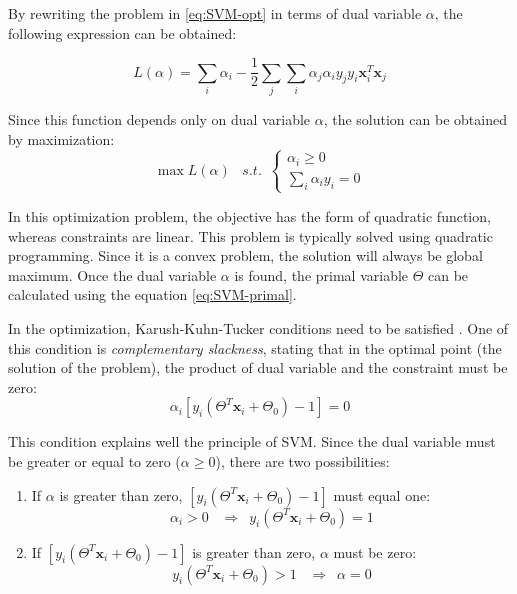 By rewriting the problem in \ref{eq:SVM-opt} in terms of dual variable $\alpha$, the following expression can be obtained:

\begin{equation} 
L(\alpha) = \sum_i \alpha_i - \frac{1}{2} \sum_j \sum_i \alpha_j \alpha_i y_j y_i \mathbf{x}_i^T \mathbf{x}_j
\end{equation}

Since this function depends only on dual variable $\alpha$, the solution can be obtained by maximization:
\begin{equation} 
\max L(\alpha) \,\,\,\,\, s.t. \,\,\, \left\{\begin{array}{lr} \alpha_i \geq 0 \\
\sum_{i} \alpha_i y_i = 0  \end{array}\right.
\end{equation}

In this optimization problem, the objective has the form of quadratic function, whereas constraints are linear. This problem is typically solved using quadratic programming. Since it is a convex problem, the solution will always be global maximum. Once the dual variable $\alpha$ is found, the primal variable $\Theta$ can be calculated using the equation \ref{eq:SVM-primal}.

In the optimization, Karush-Kuhn-Tucker conditions need to be satisfied \citep{Boyd2004}. One of this condition is \emph{complementary slackness}, stating that in the optimal point (the solution of the problem), the product of dual variable and the constraint must be zero:
\begin{equation} 
\alpha_i \left[ y_i \left( \Theta^T\mathbf{x}_i + \Theta_0  \right) -1 \right] = 0
\end{equation}

This condition explains well the principle of SVM. Since the dual variable must be greater or equal to zero ($\alpha \geq 0$), there are two possibilities:
\begin{enumerate}
\item
If $\alpha$ is greater than zero, $\left[ y_i \left( \Theta^T\mathbf{x}_i + \Theta_0  \right) -1 \right]$ must equal one:
\begin{equation} 
\alpha_i > 0 \,\,\,\,\, \Rightarrow \,\,\,  y_i \left( \Theta^T\mathbf{x}_i + \Theta_0  \right) = 1
\end{equation}
\item
If $\left[ y_i \left( \Theta^T\mathbf{x}_i + \Theta_0  \right) -1 \right]$ is greater than zero, $\alpha$ must be zero:
\begin{equation} 
y_i \left( \Theta^T\mathbf{x}_i + \Theta_0  \right) > 1 \,\,\,\,\, \Rightarrow \,\,\,  \alpha = 0
\end{equation}
\end{enumerate}

